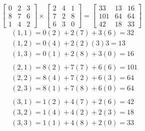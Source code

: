 \documentclass{article}
\begin{document}
\[
\begin{bmatrix}
    0 & 2 & 3 \\
    8 & 7 & 6 \\
    1 & 4 & 2
\end{bmatrix}
\times
\begin{bmatrix}
    2 & 4 & 1 \\
    7 & 2 & 8 \\
    6 & 3 & 0
\end{bmatrix}
=
\begin{bmatrix}
    33 & 13 & 16 \\
    101 & 64 & 64 \\
    42 & 18 & 33
\end{bmatrix}
\]
\begin{align}
    &(1,1) = 0(2) + 2(7) + 3(6) = 32 \\
    &(1,2) = 0(4) + 2(2) (3)3 = 13 \\
    &(1,3) = 0(1) + 2(8) + 3(0) = 16 \\
    \\
    &(2,1) = 8(2) + 7(7) + 6(6) = 101 \\
    &(2,2) = 8(4) + 7(2) + 6(3) = 64 \\
    &(2,3) = 8(1) + 7(8) + 6(0) = 64 \\
    \\
    &(3,1) = 1(2) + 4(7) + 2(6) = 42 \\
    &(3,2) = 1(4) + 4(2) + 2(3) = 18 \\
    &(3,3) = 1(1) + 4(8) + 2(0) = 33
\end{align}
\end{document}
